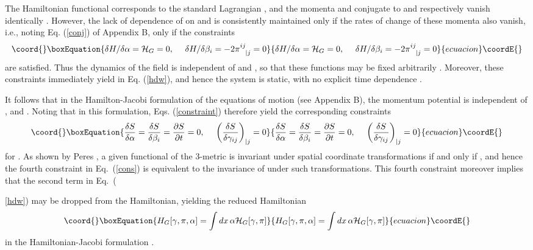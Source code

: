\documentclass[a4paper,preprint, showpacs, aps, draft]{revtex4}
\begin{document}
{The Hamiltonian functional \coordHE{} corresponds to the standard Lagrangian 
\coordHE{}, 
and the momenta \coordHE{} and \coordHE{} conjugate to \myHighlight{$\alpha$}\coordHE{} and \coordHE{}
respectively vanish identically \cite{dw}.  However, the lack of dependence of
\coordHE{} on \coordHE{} and \coordHE{} is consistently maintained only if the rates
of change of these momenta also vanish, i.e., noting Eq. (\ref{conj}) of
Appendix B, only if the constraints \cite{dw}
\begin{equation}\coord{}\boxEquation{ \label{constraint}
\delta H/\delta\alpha = {\cal H}_G = 0,~~~~\delta H/\delta\beta_i = -2
\pi^{ij}_{~~| j}=0
}{ \delta H/\delta\alpha = {\cal H}_G = 0,~~~~\delta H/\delta\beta_i = -2
\pi^{ij}_{~~| j}=0
}{ecuacion}\coordE{}\end{equation}
are satisfied.  Thus the dynamics of the field
is independent of \myHighlight{$\alpha$}\coordHE{} and \myHighlight{${\bm \beta}$}\coordHE{}, so that these 
functions may be fixed arbitrarily \cite{dw}.  Moreover, these
constraints 
immediately yield \coordHE{} in Eq. (\ref{hdw}), and hence 
the system is static, with no explicit time dependence \cite{dw}.

It follows that in the Hamilton-Jacobi formulation of the 
equations of motion (see Appendix B), 
the momentum potential \coordHE{} is 
independent of \myHighlight{$\alpha$}\coordHE{}, \myHighlight{${\bm \beta}$}\coordHE{} and \coordHE{}.  Noting that
\coordHE{} in this formulation, Eqs.
(\ref{constraint}) therefore yield the corresponding constraints
\begin{equation}\coord{}\boxEquation{ \label{cons}
\frac{\delta S}{\delta \alpha} = \frac{\delta S}{\delta\beta_i} = 
\frac{\partial S}{\partial t} = 0,~~~~
\left(\frac{\delta S}{\delta\gamma_{ij}}\right)_{| j}=0  
}{ \frac{\delta S}{\delta \alpha} = \frac{\delta S}{\delta\beta_i} = 
\frac{\partial S}{\partial t} = 0,~~~~
\left(\frac{\delta S}{\delta\gamma_{ij}}\right)_{| j}=0  
}{ecuacion}\coordE{}\end{equation} 
for \coordHE{}.  As shown by Peres \cite{peres}, a given functional \coordHE{} of the
3-metric is invariant under spatial coordinate transformations if and
only if \coordHE{}, and hence the fourth constraint
in Eq.~(\ref{cons}) is equivalent to the invariance of \coordHE{} under such
transformations.  This fourth constraint moreover implies that the
second 
term in Eq.~({\ref{hdw}) may be dropped from the Hamiltonian, 
yielding the 
reduced Hamiltonian 
\begin{equation}\coord{}\boxEquation{ \label{hgr}
H_G[\gamma,\pi,\alpha] = \int dx\,\alpha {\cal H}_G[\gamma,\pi] 
}{ H_G[\gamma,\pi,\alpha] = \int dx\,\alpha {\cal H}_G[\gamma,\pi] 
}{ecuacion}\coordE{}\end{equation}
in the Hamiltonian-Jacobi formulation \cite{peres, gerlach}.

}}
\end{document}
